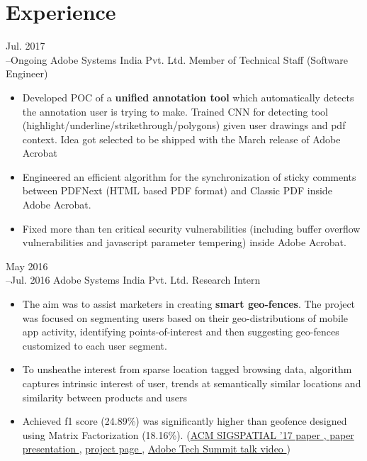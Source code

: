 \section{Experience}

\cventry
	{Jul. 2017\\--Ongoing}
	{Adobe Systems India Pvt. Ltd.}
	{Member of Technical Staff (Software Engineer)}
	{}
	{}
	{
		\begin{itemize}
			\item {
				Developed POC of a \textbf{unified annotation tool} which automatically detects the annotation user is trying to make. Trained CNN for detecting tool (highlight/underline/strikethrough/polygons) given user drawings and pdf context. Idea got selected to be shipped with the March release of Adobe Acrobat
			}
			\item {
				Engineered an efficient algorithm for the synchronization of sticky comments between PDFNext (HTML based PDF format) and Classic PDF inside Adobe Acrobat. %
			}
			\item {
				Fixed more than ten critical security vulnerabilities (including buffer overflow vulnerabilities and javascript parameter tempering) inside Adobe Acrobat. %
			}
		\end{itemize}
	}

\cventry
	{May 2016\\--Jul. 2016}
	{Adobe Systems India Pvt. Ltd.}
	{Research Intern}
	{}
	{}
	{
		\begin{itemize}
	        \item {
	        	The aim was to assist marketers in creating \textbf{smart geo-fences}. The project was focused on segmenting users based on their geo-distributions of mobile app activity, identifying points-of-interest and then suggesting geo-fences customized to each user segment.
	        }        
	        \item { 
		        To unsheathe interest from sparse location tagged browsing data, algorithm captures intrinsic interest of user, trends at semantically similar locations and similarity between products and users
		    }
		    \item {
		    	Achieved f1 score (24.89\%) was significantly higher than geofence designed using Matrix Factorization (18.16\%). \hfill (\href{https://drive.google.com/file/d/1uoMtvSSBmur6VNDnTeImWG9TrFckfpQF/view?usp=sharing}{ACM SIGSPATIAL '17 paper \ExternalLink} ,\href{https://drive.google.com/file/d/1nfCv13-7V3BElFPLBfFI\_LF0RRcsdNvy/view?usp=sharing}{ paper presentation \ExternalLink}, \href{https://research.adobe.com/project/smart-geo-fencing/}{project page \ExternalLink},  \href{https://www.youtube.com/watch?v=PS0imh951ZE}{Adobe Tech Summit talk video \ExternalLink})  
		    }
		\end{itemize}
	}
	
